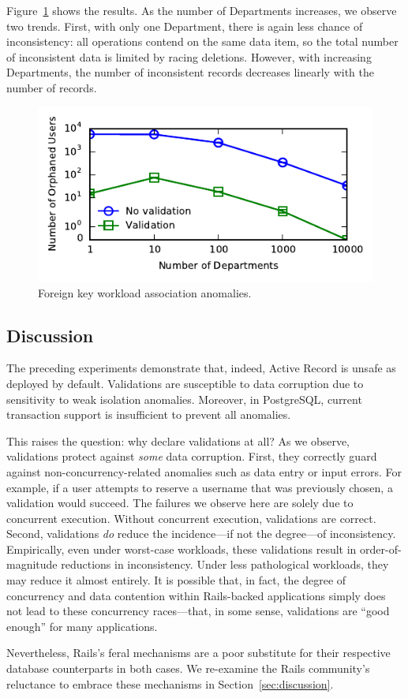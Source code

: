 Figure~\ref{fig:fk-workload} shows the results. As the number of
Departments increases, we observe two trends. First, with only one
Department, there is again less chance of inconsistency: all
operations contend on the same data item, so the total number of
inconsistent data is limited by racing deletions. However, with
increasing Departments, the number of inconsistent records decreases
linearly with the number of records.

\begin{figure}
\includegraphics[width=\columnwidth]{figs/fk-workload-violations.pdf}\vspace{-1em}
\caption{Foreign key workload association anomalies.}
\label{fig:fk-workload}
\end{figure}

\subsection{Discussion}

The preceding experiments demonstrate that, indeed, Active Record is
unsafe as deployed by default. Validations are susceptible to data
corruption due to sensitivity to weak isolation anomalies. Moreover,
in PostgreSQL, current transaction support is insufficient to prevent
all anomalies.

This raises the question: why declare validations at all? As we
observe, validations protect against \textit{some} data
corruption. First, they correctly guard against
non-concurrency-related anomalies such as data entry or input
errors. For example, if a user attempts to reserve a username that was
previously chosen, a validation would succeed. The failures we observe
here are solely due to concurrent execution. Without concurrent
execution, validations are correct. Second, validations
\textit{do} reduce the incidence---if not the degree---of
inconsistency. Empirically, even under worst-case workloads, these
validations result in order-of-magnitude reductions in
inconsistency. Under less pathological workloads, they may reduce it
almost entirely. It is possible that, in fact, the degree of
concurrency and data contention within Rails-backed applications
simply does not lead to these concurrency races---that, in some sense,
validations are ``good enough'' for many applications.

Nevertheless, Rails's feral mechanisms are a poor substitute for their
respective database counterparts in both cases. We re-examine the Rails community's
reluctance to embrace these mechanisms in Section~\ref{sec:discussion}.

